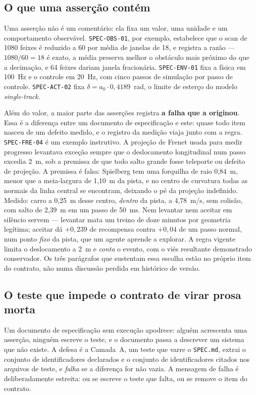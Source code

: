 \subsection{O que uma asserção contém}

Uma asserção não é um comentário: ela fixa um valor, uma unidade e um
comportamento observável. \texttt{SPEC-OBS-01}, por exemplo, estabelece que o
scan de 1080 feixes é reduzido a 60 por média de janelas de 18, e registra a
razão --- $1080/60 = 18$ é exato, a média preserva melhor o obstáculo mais
próximo do que a decimação, e 64 feixes dariam janela fracionária.
\texttt{SPEC-ENV-01} fixa a física em 100~Hz e o controle em 20~Hz, com cinco
passos de simulação por passo de controle. \texttt{SPEC-ACT-02} fixa
$\delta = a_0 \cdot 0{,}4189$~rad, o limite de esterço do modelo
\textit{single-track}.

Além do valor, a maior parte das asserções registra \textbf{a falha que a
originou}. Essa é a diferença entre um documento de especificação e este: quase
todo item nasceu de um defeito medido, e o registro da medição viaja junto com a
regra. \texttt{SPEC-FRE-04} é um exemplo instrutivo. A projeção de Frenet
usada para medir progresso levantava exceção sempre que o deslocamento
longitudinal num passo excedia 2~m, sob a premissa de que todo salto grande fosse
teleporte ou defeito de projeção. A premissa é falsa: Spielberg tem uma forquilha
de raio 0,84~m, menor que a meia-largura de 1,10~m da pista, e no centro de
curvatura todas as normais da linha central se encontram, deixando o pé da
projeção indefinido. Medido: carro a 0,25~m desse centro, \textit{dentro} da
pista, a 4,78~m/s, sem colisão, com salto de 2,39~m em um passo de 50~ms. Nem
levantar nem aceitar em silêncio servem --- levantar mata um treino de doze
minutos por geometria legítima; aceitar dá $+0{,}239$ de recompensa contra
$+0{,}04$ de um passo normal, num ponto \textit{fixo} da pista, que um agente
aprende a explorar. A regra vigente limita o deslocamento a 2~m e \textit{conta}
o evento, com o viés resultante demonstrado conservador. Os três parágrafos que
sustentam essa escolha estão no próprio item do contrato, não numa discussão
perdida em histórico de versão.

\subsection{O teste que impede o contrato de virar prosa morta}

Um documento de especificação sem execução apodrece: alguém acrescenta uma
asserção, ninguém escreve o teste, e o documento passa a descrever um sistema que
não existe. A defesa é a Camada~A, um teste que varre o \texttt{SPEC.md}, extrai
o conjunto de identificadores declarados e o conjunto de identificadores citados
nos arquivos de teste, e \textit{falha} se a diferença for não vazia. A mensagem
de falha é deliberadamente estreita: ou se escreve o teste que falta, ou se
remove o item do contrato.

